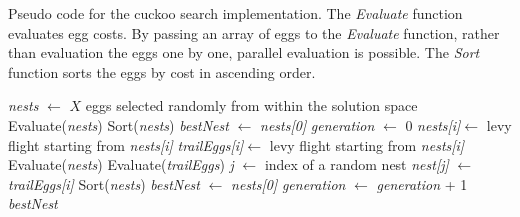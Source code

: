 \documentclass[a4paper, 12pt, sort&compress]{elsarticle}%
\begin{document}




\begin{algorithm}[h!]
  \caption{Pseudo code for the cuckoo search implementation. The
    \textit{Evaluate} function evaluates egg costs. By passing an
    array of eggs to the \textit{Evaluate} function, rather than
    evaluation the eggs one by one, parallel evaluation is
    possible. The \textit{Sort} function sorts the eggs by cost in
    ascending order.}
  \label{csAlgo}
  \begin{algorithmic}
    \State \textit{nests} $\gets$ $X$ eggs selected randomly from within the
    solution space
    \State Evaluate(\textit{nests})
    \State Sort(\textit{nests})
    \State \textit{bestNest} $\gets$ \textit{nests[0]}
    \State \textit{generation} $\gets$ 0
    \State \textit{nests[i]}$\gets$ levy flight starting from \textit{nests[i]}
    \EndFor
    \State \textit{trailEggs[i]}$\gets$ levy flight starting from \textit{nests[i]}
    \EndFor
    \State Evaluate(\textit{nests})
    \State Evaluate(\textit{trailEggs})
    \State \textit{j} $\gets$ index of a random nest
    \State \textit{nest[j]} $\gets$ \textit{trailEggs[i]}
    \EndIf
    \EndFor
    \State Sort(\textit{nests})
    \State \textit{bestNest} $\gets$ \textit{nests[0]}
    \State \textit{generation} $\gets$ \textit{generation} + 1
    \EndWhile
    \State \Return \textit{bestNest}
    \EndFunction
  \end{algorithmic}
\end{algorithm}
\end{document}
